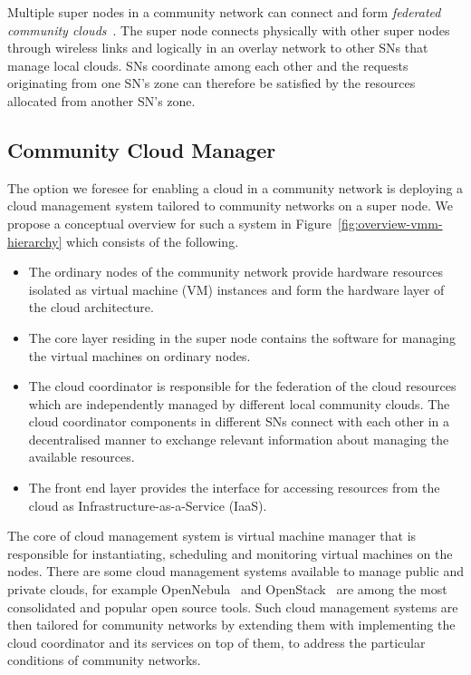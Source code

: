 Multiple super nodes in a community network can connect and form \emph{federated community clouds}~\cite{Moreno-Vozmediano2012}.
The super node connects physically with other super nodes through wireless links and logically in an overlay network to other SNs that manage local clouds.
SNs coordinate among each other and the requests originating from one SN's zone can therefore be satisfied by the resources allocated from another SN's zone.



\subsection{Community Cloud Manager}
\label{sec:arch-cloud-manager}

The option we foresee for enabling a cloud in a community network is deploying a cloud management system tailored to community networks on a super node. 
We propose a conceptual overview for such a system in Figure~\ref{fig:overview-vmm-hierarchy} which consists of the following.

\begin{itemize}
    \item The ordinary nodes of the community network provide hardware resources isolated as virtual machine (VM) instances and form the hardware layer of the cloud architecture. 
    \item The core layer residing in the super node contains the software for managing the virtual machines on ordinary nodes.
    \item The cloud coordinator is responsible for the federation of the cloud resources which are independently managed by different local community clouds.
        The cloud coordinator components in different SNs connect with each other in a decentralised manner to exchange relevant information about managing the available resources.
    \item The front end layer provides the interface for accessing resources from the cloud as Infrastructure-as-a-Service (IaaS).
\end{itemize}
    

The core of cloud management system is virtual machine manager that is responsible for instantiating, scheduling and monitoring virtual machines on the nodes.
There are some cloud management systems available to manage public and private clouds, for example OpenNebula~\cite{Moreno-Vozmediano2012} and OpenStack~\cite{Openstack} are among the most consolidated and popular open source tools.
Such cloud management systems are then tailored for community networks by extending them with implementing the cloud coordinator and its services on top of them, to address the particular conditions of community networks.

